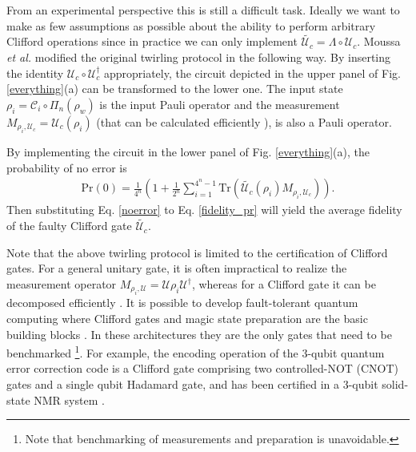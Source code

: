 \documentclass[prl,twocolumn,showpacs,superscriptaddress]{revtex4-1}
\newcommand{\R}[1]{{\color{red}#1}}
\begin{document}
From an experimental perspective this is still a difficult task. Ideally we want to make as few assumptions as possible about the ability to perform arbitrary Clifford operations since in practice  we can only implement $\tilde{\mathcal{U}_c} =\Lambda\circ \mathcal{U}_c$.  Moussa \emph{et al.}  \cite{Moussa2012} modified the  original twirling protocol in the following way.  By inserting the identity $\mathcal{U}_c \circ \mathcal{U}_c^\dagger$ appropriately, the circuit depicted in the upper panel of Fig. \ref{everything}(a) can be transformed to the lower one.   The input state $\rho_{i} = \mathcal{C}_i \circ \Pi_n( \rho_{w})$ is the input Pauli operator %
 and the measurement $M_{\rho_i, \mathcal{U}_c} = \mathcal{U}_c( \rho_{i})$ (that can be calculated efficiently \cite{Aaronson2004}),
is also a Pauli operator.

By implementing the circuit in the lower panel of Fig. \ref{everything}(a), the probability of no error is \cite{Alex2013} %
\begin{align} \label{noerror}
\text{Pr}(0) = \frac{1}{4^n} \left( 1+ \frac{1}{2^n}\sum_{i=1}^{4^n-1} \text{Tr}\left( \tilde{\mathcal{U}_c} \left( \rho_{i}\right) M_{\rho_i, \mathcal{U}_c}\right)\right).
\end{align}
Then substituting Eq. \eqref{noerror} to Eq. \eqref{fidelity_pr} will yield the average fidelity of the faulty Clifford gate $\tilde{\mathcal{U}_c}$.

Note that the above twirling protocol is limited to the certification of Clifford gates. For a general unitary gate, it is often impractical to realize the measurement operator $M_{\rho_i, \mathcal{U}} = \mathcal{U} \rho_{i} \mathcal{U}^{\dagger}$, whereas for a Clifford gate it can be decomposed  efficiently \cite{Aaronson2004}. It is possible to develop fault-tolerant  quantum computing where Clifford gates and  magic state preparation are the basic building blocks \cite{Bravyi2005,Souza2011}. In  these architectures   they are the only gates that need to be benchmarked \footnote{Note that benchmarking of measurements and preparation is unavoidable.}. For example, the encoding operation of the 3-qubit quantum error correction code is a Clifford gate comprising two controlled-NOT (CNOT) gates and a single qubit Hadamard gate, and has been certified in a 3-qubit solid-state NMR system \cite{Moussa2012}.
\end{document}
